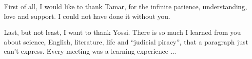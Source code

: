First of all, I would like to thank Tamar, for the infinite patience,
understanding, love and support. I could not have done it without you.

Last, but not least, I want to thank Yossi. There is so much I learned from
  you about science, English, literature, life and “judicial piracy”, that 
  a paragraph just can't express. Every meeting was a learning experience ...
